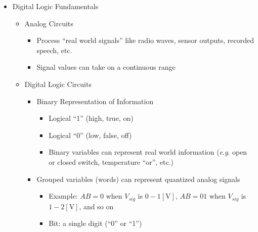 \begin{itemize}

  \item Digital Logic Fundamentals

    \begin{itemize}

      \item Analog Circuits

        \begin{itemize}

          \item Process ``real world signals'' like radio waves, sensor outputs, recorded speech, etc.

          \item Signal values can take on a continuous range

        \end{itemize}

      \item Digital Logic Circuits

        \begin{itemize}

          \item Binary Representation of Information

            \begin{itemize}

              \item Logical ``1'' (high, true, on)

              \item Logical ``0'' (low, false, off)

              \item Binary variables can represent real world information (\textit{e}.\textit{g}. open or closed switch, temperature ``or'', etc.)

            \end{itemize}

          \item Grouped variables (words) can represent quantized analog signals

            \begin{itemize}

              \item Example: $AB=0$ when $V_{sig}$ is $0-1[\si{\volt}]$, $AB=01$ when $V_{sig}$ is $1-2[\si{\volt}]$, and so on

              \item Bit: a single digit (``0'' or ``1'')


\end{itemize}
\end{itemize}
\end{itemize}
\end{itemize}
